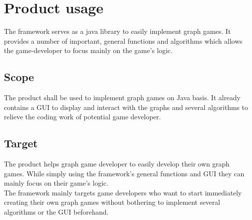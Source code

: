 \section{Product usage}
The \gls{framework} serves as a \Gls{java} \gls{library} to easily implement \gls{graph} games. It provides a number of important, general functions and algorithms which allows the \gls{game-developer} to focus mainly on the game's logic.

\subsection{Scope}
The product shall be used to implement graph games on Java basis. It already contains a \gls{GUI} to display and interact with the graphs and several algorithms to relieve the coding work of potential game developer.

\subsection{Target}
The product helps graph game developer to easily develop their own graph games. While simply using the framework's general functions and \gls{GUI} they can mainly focus on their game's logic. \\
The framework mainly targets game developers who want to start immediately creating their own graph games without bothering to implement several algorithms or the \gls{GUI} beforehand.